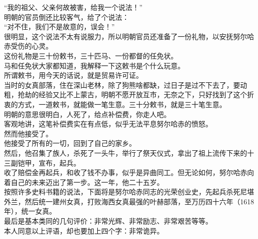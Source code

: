\begin{multicols}{\theparacolNo}
“我的祖父、父亲何故被害，给我一个说法！”\\

明朝的官员倒还比较客气，给了个说法：\\

“对不住，我们不是故意的，误会！”\\

很明显，这个说法不太有说服力，所以明朝官员还准备了一份礼物，以安抚努尔哈赤受伤的心灵。\\

这份礼物是三十份敕书，三十匹马、一份都督的任免状。\\

马和任免状大家都知道，我解释一下这敕书是个什么玩意。\\

所谓敕书，用今天的话说，就是贸易许可证。\\

当时的女真部落，住在深山老林，除了狗熊啥都缺，过日子是过不下去了，要动粗，抢劫的经验又比不上蒙古，明朝不愿开放互市，无奈之下，只好找到了这个折衷的方式，一道敕书，就能做一笔生意。三十分敕书，就是三十笔生意。\\

明朝的意思很明白，人死了，给点补偿费，你走人吧。\\

客观地讲，这笔补偿费实在有点低，似乎无法平息努尔哈赤的愤怒。\\

然而他接受了。\\

他接受了所有的一切，回到了自己的家乡。\\

然后，他召集了族人，杀死了一头牛，举行了祭天仪式，拿出了祖上流传下来的十三副铠甲，宣布，起兵。\\

收了赔偿金再起兵，和收了钱不办事，似乎是异曲同工。但无论如何，努尔哈赤向着自己的未来迈出了第一步。这一年，他二十五岁。\\

按照许多史料书籍的说法，下面将是努尔哈赤同志的光荣创业史，先起兵杀死尼堪外兰，然后统一建州女真，打败海西女真最强的叶赫部落，至万历四十六年（1618年），统一女真。\\

最后是基本类同的几句评价：非常光辉、非常励志、非常艰苦等等。\\

本人同意以上评语，却也要加上四个字：非常诡异。\\


\end{multicols}
